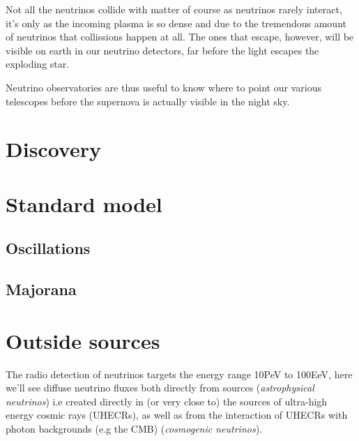 \documentclass[11pt,a4paper,faculty=we,language=en,doctype=report]{cls/ugent-doc}
\begin{document}
Not all the neutrinos collide with matter of course as neutrinos rarely
interact, it's only as the incoming plasma is so dense and due to the
tremendous amount of neutrinos that collissions happen at all. The ones that
escape, however, will be visible on earth in our neutrino detectors, far before
the light escapes the exploding star.

Neutrino observatories are thus useful to know where to point our various
telescopes before the supernova is actually visible in the night sky.
\section{Discovery}
\section{Standard model}
\subsection{Oscillations}
\subsection{Majorana}
\section{Outside sources}
The radio detection of neutrinos targets the energy range 10PeV to 100EeV\cite{Aguilar_2021}, here we'll see diffuse neutrino fluxes both directly from sources (\textit{astrophysical neutrinos}) i.e created directly in (or very close to) the sources of ultra-high energy cosmic rays (UHECRs), as well as from the interaction of UHECRs with photon backgrounds (e.g the CMB) (\textit{cosmogenic neutrinos}).
\end{document}
